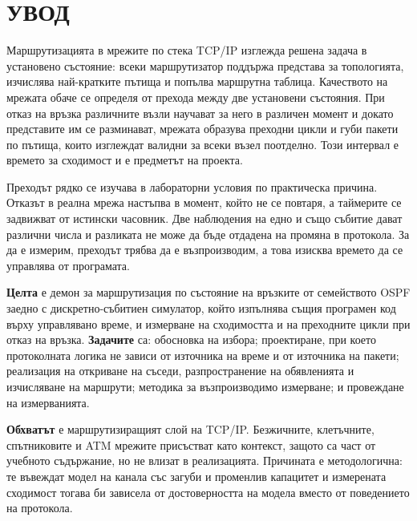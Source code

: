 \section*{УВОД}
\label{sec:introduction}

Маршрутизацията в мрежите по стека TCP/IP изглежда решена задача в установено състояние:
всеки маршрутизатор поддържа представа за топологията, изчислява най-кратките пътища и
попълва маршрутна таблица. Качеството на мрежата обаче се определя от прехода между две
установени състояния. При отказ на връзка различните възли научават за него в различен
момент и докато представите им се разминават, мрежата образува преходни цикли и губи пакети
по пътища, които изглеждат валидни за всеки възел поотделно. Този интервал е времето за
сходимост и е предметът на проекта.

Преходът рядко се изучава в лабораторни условия по практическа причина. Отказът в реална
мрежа настъпва в момент, който не се повтаря, а таймерите се задвижват от истински часовник.
Две наблюдения на едно и също събитие дават различни числа и разликата не може да бъде
отдадена на промяна в протокола. За да е измерим, преходът трябва да е възпроизводим, а това
изисква времето да се управлява от програмата.

\textbf{Целта} е демон за маршрутизация по състояние на връзките от семейството OSPF заедно с
дискретно-събитиен симулатор, който изпълнява същия програмен код върху управлявано време, и
измерване на сходимостта и на преходните цикли при отказ на връзка. \textbf{Задачите} са:
обосновка на избора; проектиране, при което протоколната логика не зависи от източника на
време и от източника на пакети; реализация на откриване на съседи, разпространение на
обявленията и изчисляване на маршрути; методика за възпроизводимо измерване; и провеждане на
измерванията.

\textbf{Обхватът} е маршрутизиращият слой на TCP/IP. Безжичните, клетъчните, спътниковите и
ATM мрежите присъстват като контекст, защото са част от учебното съдържание, но не влизат в
реализацията. Причината е методологична: те въвеждат модел на канала със загуби и променлив
капацитет и измерената сходимост тогава би зависела от достоверността на модела вместо от
поведението на протокола.